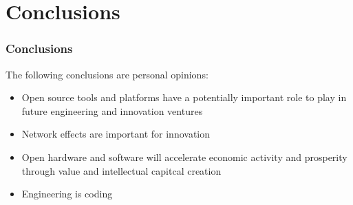 \documentclass{beamer}
\begin{document}

\section{Conclusions}

\begin{frame}
\frametitle{Conclusions}

The following conclusions are personal opinions:

\begin{itemize}
\item Open source tools and platforms have a potentially important role to play in future engineering and innovation ventures
\item Network effects are important for innovation
\item Open hardware and software will accelerate economic activity and prosperity through value and intellectual capitcal creation
\item Engineering is coding
\end{itemize}
\end{frame}
\end{document}
